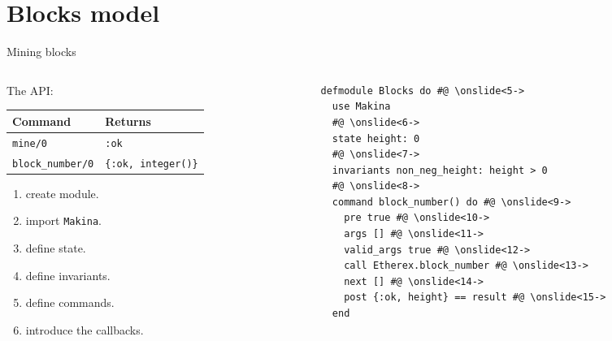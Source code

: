 \documentclass[aspectratio=169, 10pt]{beamer}
\begin{document}
\section{Blocks model}
\label{sec:org3352406}
\begin{frame}[label={sec:orgfc85408},fragile]{Mining blocks}
 \begin{columns}
\begin{column}{0.48\columnwidth}
\onslide<+->
\onslide<+->
The API:
\onslide<+->
\begin{center}
\begin{tabular}{ll}
Command & Returns\\
\hline
\texttt{mine/0} & \texttt{:ok}\\
\texttt{block\_number/0} & \texttt{\{:ok, integer()\}}\\
\end{tabular}
\end{center}
\onslide<+->
\vspace{10pt}
\begin{enumerate}
\item create module.
\onslide<+->
\item import \texttt{Makina}.
\onslide<+->
\item define state.
\onslide<+->
\item define invariants.
\onslide<+->
\item define commands.
\onslide<+->
\item introduce the callbacks.
\end{enumerate}
\end{column}

\begin{column}{0.48\columnwidth}
\lstset{language=elixir,label= ,caption= ,captionpos=b,numbers=none,style=display}
\begin{lstlisting}
defmodule Blocks do #@ \onslide<5->
  use Makina
  #@ \onslide<6->
  state height: 0
  #@ \onslide<7->
  invariants non_neg_height: height > 0
  #@ \onslide<8->
  command block_number() do #@ \onslide<9->
    pre true #@ \onslide<10->
    args [] #@ \onslide<11->
    valid_args true #@ \onslide<12->
    call Etherex.block_number #@ \onslide<13->
    next [] #@ \onslide<14->
    post {:ok, height} == result #@ \onslide<15->
  end
\end{lstlisting}
\end{column}
\end{columns}
\end{frame}
\end{document}
